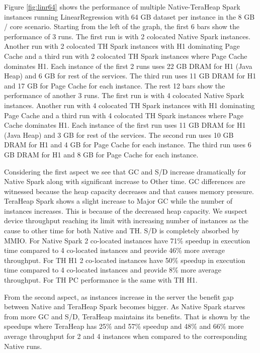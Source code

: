 Figure \ref{fig:linr64} shows the performance of multiple
Native-TeraHeap Spark instances running LinearRegression with 64 GB
dataset per instance in the 8 GB / core scenario.
Starting from the left of the graph, the first 6 bars show the
performance of 3 runs. The first run is with 2 colocated Native Spark instances.
Another run with 2 colocated TH Spark instances with H1 dominating Page Cache
and a third run with 2 colocated TH Spark instances where Page Cache dominates H1.
Each instance of the first 2 runs uses 22 GB DRAM for H1 (Java Heap) and 6 GB for rest of the services.
The third run uses 11 GB DRAM for H1 and 17 GB for Page Cache for each instance.
The rest 12 bars show the performance of another 3 runs. The first run is with 4 colocated Native Spark instances.
Another run with 4 colocated TH Spark instances with H1 dominating Page Cache
and a third run with 4 colocated TH Spark instances where Page Cache dominates H1.
Each instance of the first run uses 11 GB DRAM for H1 (Java Heap) and 3 GB for rest of the services.
The second run uses 10 GB DRAM for H1 and 4 GB for Page Cache for each instance.
The third run uses 6 GB DRAM for H1 and 8 GB for Page Cache for each instance.

Considering the first aspect we see that GC and S/D increase dramatically for Native Spark along with significant increase to Other time. GC differences are witnessed because the heap capacity decreases and that causes memory pressure. TeraHeap Spark shows a slight increase to Major GC while the number of instances increases. This is because of the decreased heap capacity. We suspect device throughput reaching its limit with increasing number of instances as the cause to other time for both Native and TH. S/D is completely absorbed by MMIO. For Native Spark 2 co-located instances have 71\% speedup in execution time compared to 4 co-located instances and provide 46\% more average throughput. For TH H1 2 co-located instances have 50\% speedup in execution time compared to 4 co-located instances and provide 8\% more average throughput. For TH PC performance is the same with TH H1.

From the second aspect, as instances increase in the server the benefit gap between Native and TeraHeap Spark becomes bigger. As Native Spark starves from more GC and S/D, TeraHeap maintains its benefits. That is shown by the speedups where TeraHeap has 25\% and 57\% speedup and 48\% and 66\% more average throughput for 2 and 4 instances when compared to the corresponding Native runs.

